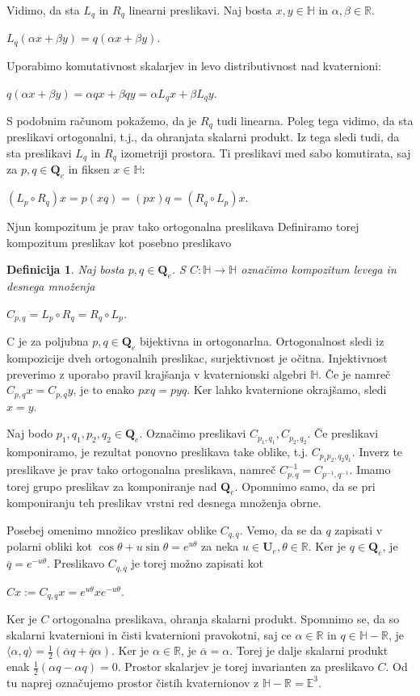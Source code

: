 \documentclass[a4paper,12pt]{article}
\def\R{\mathbb{R}} %
\def\H{\mathbb{H}} %
\def\Qe{\textbf{Q}_{e}} %
\def\Ue{\textbf{U}_{e}} %
\newcommand{\conj}[1]{\overline{#1}}
\newtheorem{definicija}{Definicija}
\begin{document}
Vidimo, da sta $L_{q}$ in $R_{q}$ linearni preslikavi. Naj bosta $x,y \in \H$ in $\alpha, \beta \in \R$.
\begin{center}
   $L_{q}(\alpha x +\beta y) = q(\alpha x +\beta y)$.
\end{center}
Uporabimo komutativnost skalarjev in levo distributivnost nad kvaternioni:
\begin{center}
   $q(\alpha x +\beta y) = \alpha qx + \beta qy = \alpha L_{q}x + \beta L_{q}y$.
\end{center}
S podobnim računom pokažemo, da je $R_{q}$ tudi linearna. Poleg tega vidimo, da sta preslikavi ortogonalni,
t.j., da ohranjata skalarni produkt. Iz tega sledi tudi, da sta preslikavi $L_{q}$ in $R_{q}$ izometriji prostora.
Ti preslikavi med sabo komutirata, saj za $p,q \in \Qe$ in fiksen $x \in \H$:
\begin{center}
   $(L_{p} \circ R_{q})x = p(xq) = (px)q = (R_{q} \circ L_{p})x$.
\end{center}
Njun kompozitum je prav tako ortogonalna preslikava
Definiramo torej kompozitum preslikav kot posebno preslikavo
\begin{definicija}
Naj bosta $p,q \in \Qe$. S $C: \H \to \H$ označimo kompozitum levega in desnega množenja
\begin{center}
   $C_{p,q} = L_{p} \circ R_{q} = R_{q} \circ L_{p}$.
\end{center}
\end{definicija}
C je za poljubna $p,q \in \Qe$ bijektivna in ortogonarlna. Ortogonalnost sledi iz kompozicije dveh ortogonalnih preslikac,
surjektivnost je očitna. Injektivnost preverimo z uporabo pravil krajšanja v kvaternionski algebri $\H$.
Če je namreč $C_{p,q}x = C_{p,q}y$, je to enako $pxq = pyq$. Ker lahko kvaternione okrajšamo, sledi $x = y$.

Naj bodo $p_1, q_1, p_2, q_2 \in \Qe$. Označimo preslikavi $C_{p_1, q_1}, C_{p_2,q_2}$. Če preslikavi komponiramo, je rezultat ponovno preslikava take oblike, t.j.
$C_{p_1 p_2, q_2 q_1}$. Inverz te preslikave je prav tako ortogonalna preslikava, namreč $C^{-1}_{p,q} = C_{p^{-1}, q^{-1}}.$ 
Imamo torej grupo preslikav za komponiranje nad $\Qe$.
Opomnimo samo, da se pri komponiranju teh preslikav vrstni red desnega množenja obrne.

Posebej omenimo množico preslikav oblike $C_{q,\conj{q}}$. Vemo, da se da $q$ zapisati v polarni obliki kot
$\cos\theta + u\sin\theta = e^{u\theta}$ za neka $u \in \Ue, \theta \in \R$. Ker je $q \in \Qe$, je $\conj{q} = e^{-u\theta}$.
Preslikavo $C_{q, \conj{q}}$ je torej možno zapisati kot
\begin{center}
   $Cx := C_{q, \conj{q}} x = e^{u\theta}x e^{-u\theta}$.
\end{center}
Ker je $C$ ortogonalna preslikava, ohranja skalarni produkt. Spomnimo se, da so skalarni kvaternioni in čisti kvaternioni pravokotni,
saj ce $\alpha \in \R$ in $q \in \H - \R$, je $\langle \alpha, q\rangle = \frac{1}{2} (\conj{\alpha}q + \conj{q}\alpha)$. Ker je $\alpha \in \R$, je $\conj{\alpha} = \alpha$.
Torej je dalje skalarni produkt enak $\frac{1}{2}(\alpha q - \alpha q) = 0$. Prostor skalarjev je torej invarianten za preslikavo $C$.
Od tu naprej označujemo prostor čistih kvaternionov z $\H - \R = \mathbb{E}^3$.
\end{document}

